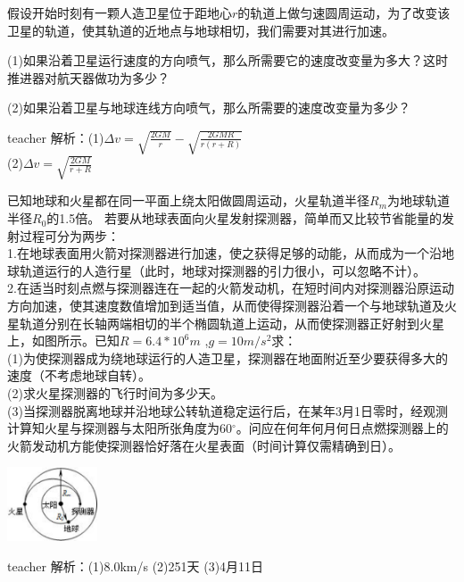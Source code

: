 \begin{example}
假设开始时刻有一颗人造卫星位于距地心$r$的轨道上做匀速圆周运动，为了改变该卫星的轨道，使其轨道的近地点与地球相切，我们需要对其进行加速。

(1)如果沿着卫星运行速度的方向喷气，那么所需要它的速度改变量为多大？这时推进器对航天器做功为多少？

(2)如果沿着卫星与地球连线方向喷气，那么所需要的速度改变量为多少？
\begin{taggedblock}{teacher}
\newline
解析：(1)$\Delta v=\sqrt{\frac{2GM}{r}}-\sqrt{\frac{2GMR}{r(r+R)}}$
\\(2)$\Delta v=\sqrt{\frac{2GM}{r+R}}$
\end{taggedblock}
\end{example}


\begin{example}
已知地球和火星都在同一平面上绕太阳做圆周运动，火星轨道半径$R_m$为地球轨道半径$R_0$的1.5倍。
若要从地球表面向火星发射探测器，简单而又比较节省能量的发射过程可分为两步：
\\1.在地球表面用火箭对探测器进行加速，使之获得足够的动能，从而成为一个沿地球轨道运行的人造行星（此时，地球对探测器的引力很小，可以忽略不计）。
\\2.在适当时刻点燃与探测器连在一起的火箭发动机，在短时间内对探测器沿原运动方向加速，使其速度数值增加到适当值，从而使得探测器沿着一个与地球轨道及火星轨道分别在长轴两端相切的半个椭圆轨道上运动，从而使探测器正好射到火星上，如图所示。已知$R=6.4*10^6m$ ,$g=10m/s^2$求：
\\(1)为使探测器成为绕地球运行的人造卫星，探测器在地面附近至少要获得多大的速度（不考虑地球自转）。
\\(2)求火星探测器的飞行时间为多少天。
\\(3)当探测器脱离地球并沿地球公转轨道稳定运行后，在某年3月1日零时，经观测计算知火星与探测器与太阳所张角度为60$^\circ$。问应在何年何月何日点燃探测器上的火箭发动机方能使探测器恰好落在火星表面（时间计算仅需精确到日）。
\begin{flushright}
		\includegraphics[width = 0.2\textwidth]{images/gravity-3.pdf} 
	\end{flushright}
\begin{taggedblock}{teacher}
\noindent
解析：(1)8.0km/s
(2)251天
(3)4月11日
\end{taggedblock}
\end{example}



